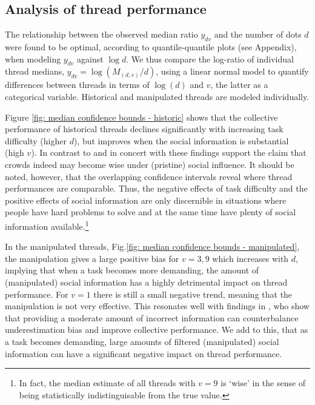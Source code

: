 \documentclass[9pt,twocolumn,twoside,lineno]{pnas-new}
\begin{document}
\subsection*{Analysis of thread performance}
The relationship between the observed median ratio $y_{dv}$ and the number of dots $d$ were found to be optimal, according to quantile-quantile plots (see Appendix), when modeling $y_{dv}$ against $\log{d}$. We thus compare the log-ratio of individual thread medians, $y_{dv}=\log(M_{(d,v)}/d)$, using a linear normal model to quantify differences between threads in terms of $\log(d)$ and $v$, the latter as a categorical variable. Historical and manipulated threads are modeled individually.

Figure \ref{fig: median confidence bounds - historic} shows that the collective performance of historical threads declines significantly with increasing task difficulty (higher $d$), but improves when the social information is substantial (high $v$). In contrast to \cite{lorenz2011social, king2011true, minson2012cost} and in concert with \cite{gurccay2015power, becker2017network, jayles2017social, farrell2011social} these findings support the claim that crowds indeed may become wise under (pristine) social influence. It should be noted, however, that the overlapping confidence intervals reveal where thread performances are comparable. Thus, the negative effects of task difficulty and the positive effects of social information are only discernible in situations where people have hard problems to solve and at the same time have plenty of social information available.\footnote{In fact, the median estimate of all threads with $v=9$ is `wise' in the sense of being statistically indistinguisable from the true value.}

In the manipulated threads, Fig.\ref{fig: median confidence bounds - manipulated}, the manipulation gives a large positive bias for $v=3,9$ which increases with $d$, implying that when a task becomes more demanding, the amount of (manipulated) social information has a highly detrimental impact on thread performance. For $v=1$ there is still a small negative trend, meaning that the manipulation is not very effective. This resonates well with findings in \cite{jayles2017social}, who show that providing a moderate amount of incorrect information can counterbalance underestimation bias and improve collective performance. We add to this, that as a task becomes demanding, large amounts of filtered (manipulated) social information can have a significant negative impact on thread performance. %
\end{document}
